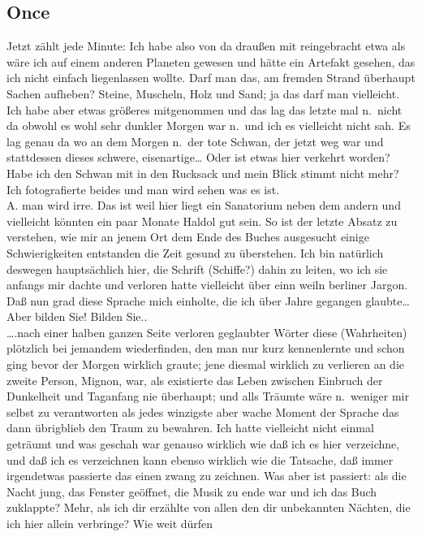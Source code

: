 \documentclass[
]{article}
\author{}
\date{\vspace{-2.5em}}
\begin{document}
\subsection{Once}\label{once}

Jetzt zählt jede Minute: Ich habe also von da draußen mit reingebracht
etwa als wäre ich auf einem anderen Planeten gewesen und hätte ein
Artefakt gesehen, das ich nicht einfach liegenlassen wollte. Darf man
das, am fremden Strand überhaupt Sachen aufheben? Steine, Muscheln, Holz
und Sand; ja das darf man vielleicht. Ich habe aber etwas größeres
mitgenommen und das lag das letzte mal n.~nicht da obwohl es wohl sehr
dunkler Morgen war n.~und ich es vielleicht nicht sah. Es lag genau da
wo an dem Morgen n.~der tote Schwan, der jetzt weg war und stattdessen
dieses schwere, eisenartige\ldots{} Oder ist etwas hier verkehrt worden?
Habe ich den Schwan mit in den Rucksack und mein Blick stimmt nicht
mehr? Ich fotografierte beides und man wird sehen was es ist.\\
A. man wird irre. Das ist weil hier liegt ein Sanatorium neben dem
andern und vielleicht könnten ein paar Monate Haldol gut sein. So ist
der letzte Absatz zu verstehen, wie mir an jenem Ort dem Ende des Buches
ausgesucht einige Schwierigkeiten entstanden die Zeit gesund zu
überstehen. Ich bin natürlich deswegen hauptsächlich hier, die Schrift
(Schiffe?) dahin zu leiten, wo ich sie anfangs mir dachte und verloren
hatte vielleicht über einn weiln berliner Jargon. Daß nun grad diese
Sprache mich einholte, die ich über Jahre gegangen glaubte\ldots{} Aber
bilden Sie! Bilden Sie..\\
\ldots.nach einer halben ganzen Seite verloren geglaubter Wörter diese
(Wahrheiten) plötzlich bei jemandem wiederfinden, den man nur kurz
kennenlernte und schon ging bevor der Morgen wirklich graute; jene
diesmal wirklich zu verlieren an die zweite Person, Mignon, war, als
existierte das Leben zwischen Einbruch der Dunkelheit und Taganfang nie
überhaupt; und alls Träumte wäre n.~weniger mir selbst zu verantworten
als jedes winzigste aber wache Moment der Sprache das dann übrigblieb
den Traum zu bewahren. Ich hatte vielleicht nicht einmal geträumt und
was geschah war genauso wirklich wie daß ich es hier verzeichne, und daß
ich es verzeichnen kann ebenso wirklich wie die Tatsache, daß immer
irgendetwas passierte das einen zwang zu zeichnen. Was aber ist
passiert: als die Nacht jung, das Fenster geöffnet, die Musik zu ende
war und ich das Buch zuklappte? Mehr, als ich dir erzählte von allen den
dir unbekannten Nächten, die ich hier allein verbringe? Wie weit dürfen
\end{document}
